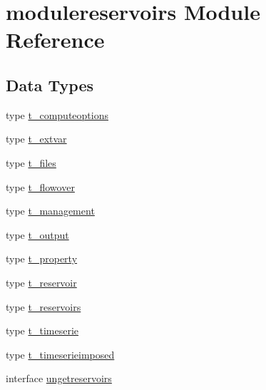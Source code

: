 \hypertarget{namespacemodulereservoirs}{}\section{modulereservoirs Module Reference}
\label{namespacemodulereservoirs}
\subsection*{Data Types}
\begin{DoxyCompactItemize}
\item 
type \mbox{\hyperlink{structmodulereservoirs_1_1t__computeoptions}{t\+\_\+computeoptions}}
\item 
type \mbox{\hyperlink{structmodulereservoirs_1_1t__extvar}{t\+\_\+extvar}}
\item 
type \mbox{\hyperlink{structmodulereservoirs_1_1t__files}{t\+\_\+files}}
\item 
type \mbox{\hyperlink{structmodulereservoirs_1_1t__flowover}{t\+\_\+flowover}}
\item 
type \mbox{\hyperlink{structmodulereservoirs_1_1t__management}{t\+\_\+management}}
\item 
type \mbox{\hyperlink{structmodulereservoirs_1_1t__output}{t\+\_\+output}}
\item 
type \mbox{\hyperlink{structmodulereservoirs_1_1t__property}{t\+\_\+property}}
\item 
type \mbox{\hyperlink{structmodulereservoirs_1_1t__reservoir}{t\+\_\+reservoir}}
\item 
type \mbox{\hyperlink{structmodulereservoirs_1_1t__reservoirs}{t\+\_\+reservoirs}}
\item 
type \mbox{\hyperlink{structmodulereservoirs_1_1t__timeserie}{t\+\_\+timeserie}}
\item 
type \mbox{\hyperlink{structmodulereservoirs_1_1t__timeserieimposed}{t\+\_\+timeserieimposed}}
\item 
interface \mbox{\hyperlink{interfacemodulereservoirs_1_1ungetreservoirs}{ungetreservoirs}}
\end{DoxyCompactItemize}
